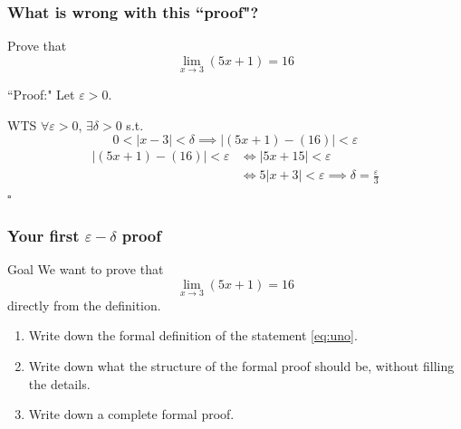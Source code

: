 \documentclass[14pt]{beamer}
\begin{document}
\begin{frame}
	\frametitle{What is wrong with this ``proof"?}
	\fontsize{13}{13}\selectfont
	\vspace{-2mm}
	\begin{block}{}%
		Prove that
		\[
			\lim_{x\to 3}(5x+1) = 16
		\]
	\end{block}

	\begin{block}{``Proof:"}
		Let $\varepsilon>0$.

		WTS $\forall \varepsilon>0$, $\exists\delta>0$ s.t.
		\[
			0<|x-3|<\delta \implies |(5x+1) - (16)|<\varepsilon
		\]
		\vspace{-3mm}
		\begin{align*}
			|(5x+1) - (16)|<\varepsilon & \iff |5x+15|<\varepsilon                                     \\
			                            & \iff 5|x+3|<\varepsilon \implies\delta=\frac{\varepsilon}{3}
		\end{align*}
		\hfill $\square$
	\end{block}
\end{frame}

\begin{frame}[t]
	\frametitle{Your first $\varepsilon-\delta$ proof}

	\begin{block}{Goal}
		We want to prove that
		\begin{equation}
			\label{eq:uno}\lim_{x \to 3}\left( 5x + 1 \right) = 16
		\end{equation}
		directly from the definition.
	\end{block}
	\vfill
	\begin{enumerate}

		\item Write down the formal definition of the statement \eqref{eq:uno}.

		\item Write down what the structure of the formal proof should be, without
			filling the details.

		\item Write down a complete formal proof.
	\end{enumerate}
	\vfill
\end{frame}
\end{document}
